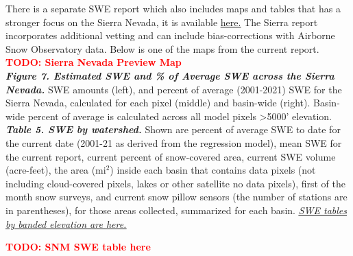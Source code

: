 \documentclass{article}
\begin{document}
\noindent There is a separate SWE report which also includes maps and tables that has a stronger focus on the Sierra Nevada, it is available \href{https://github.com/CU-Mountain-Hydrology/SierraNevada}{\underline{here.}} The Sierra report incorporates additional vetting and can include bias-corrections with Airborne Snow Observatory data. Below is one of the maps from the current report.\\

\textcolor{red}{\textbf{TODO: Sierra Nevada Preview Map}}\\

\noindent\textbf{\textit{Figure 7. Estimated SWE and \% of Average SWE across the Sierra Nevada.}} SWE amounts (left), and percent of average (2001-2021) SWE for the Sierra Nevada, calculated for each pixel (middle) and basin-wide (right). Basin-wide percent of average is calculated across all model pixels >5000’ elevation.\\

\noindent\textbf{\textit{Table 5. SWE by watershed.}} Shown are percent of average SWE to date for the current date (2001-21 as derived from the regression model), mean SWE for the current report, current percent of snow-covered area, current SWE volume (acre-feet), the area (mi$^2$) inside each basin that contains data pixels (not including cloud-covered pixels, lakes or other satellite no data pixels), first of the month snow surveys, and current snow pillow sensors (the number of stations are in parentheses), for those areas collected, summarized for each basin. \hyperref[sec:elev_band_swe]{\underline{\textit{SWE tables by banded elevation are here.}}}

\textcolor{red}{\textbf{TODO: SNM SWE table here}}\\

\newpage
\end{document}
